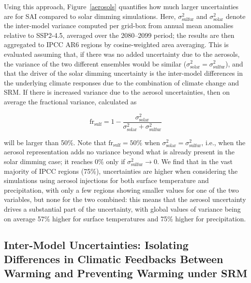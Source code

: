 \documentclass[draft]{agujournal2019}
\begin{document}
Using this approach, Figure~\ref{aerosols} quantifies how much larger uncertainties are for SAI compared to solar dimming simulations. Here, $\sigma^2_{\mathrm{sulfur}}$ and $\sigma^2_{\mathrm{solar}}$ denote the inter-model variance computed per grid-box from annual mean anomalies relative to SSP2-4.5, averaged over the 2080--2099 period; the results are then aggregated to IPCC AR6 regions by cosine-weighted area averaging. This is evaluated assuming that, if there was no added uncertainty due to the aerosols, the variance of the two different ensembles would be similar ($\sigma^2_{\mathrm{solar}} = \sigma^2_{\mathrm{sulfur}}$), and that the driver of the solar dimming uncertainty is the inter-model differences in the underlying climate responses due to the combination of climate change and SRM. If there is increased variance due to the aerosol uncertainties, then on average the fractional variance, calculated as
\begin{linenomath*}
\begin{equation}\label{eqn.frsulf}
\mbox{fr}_{\mathrm{sulf}} = 1 -\frac{\sigma^2_{\mathrm{solar}}}{\sigma^2_{\mathrm{solar}}+\sigma^2_{\mathrm{sulfur}}}
\end{equation}
\end{linenomath*}
will be larger than 50\%. Note that $\mbox{fr}_{\mathrm{sulf}} = 50\%$ when $\sigma^2_{\mathrm{solar}} = \sigma^2_{\mathrm{sulfur}}$, i.e., when the aerosol representation adds no variance beyond what is already present in the solar dimming case; it reaches 0\% only if $\sigma^2_{\mathrm{sulfur}} \to 0$. We find that in the vast majority of IPCC regions (75\%), uncertainties are higher when considering the simulations using aerosol injections for both surface temperature and precipitation, with only a few regions showing smaller values for one of the two variables, but none for the two combined: this means that the aerosol uncertainty drives a substantial part of the uncertainty, with global values of variance being on average 57\% higher for surface temperatures and 75\% higher for precipitation.\\

\subsection{Inter-Model Uncertainties: Isolating Differences in Climatic Feedbacks Between Warming and Preventing Warming under SRM}
\end{document}
